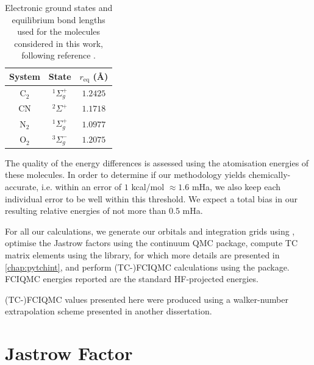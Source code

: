 \begin{table}[htbp]
    \centering
      \caption{
      Electronic ground states and equilibrium bond lengths used for the
      molecules considered in this work, following reference .
    }
    \label{table:bond_lengths}
    \begin{tabular}{ccc}
      System & State & $r_\mathrm{eq}$ (\AA) \\
    \hline \hline
      C$_2$ & ${}^1\Sigma_g^+$ & $1.2425$ \\
      CN    & ${}^2\Sigma^+$   & $1.1718$ \\
      N$_2$ & ${}^1\Sigma_g^+$ & $1.0977$ \\
      O$_2$ & ${}^3\Sigma_g^-$ & $1.2075$ \\
    \hline
    \end{tabular}
\end{table}

The quality of the energy differences is assessed using the atomisation energies of these molecules. In order to determine if our methodology yields chemically-accurate, i.e. within an error of $1$ kcal/mol $\approx 1.6$ mHa, we also keep each individual error to be well within this threshold. We expect a total bias in our resulting relative energies of not more than $0.5$ mHa.

For all our calculations, we generate our orbitals and integration grids using \pyscf,\supercite{sunPySCF2018} optimise the Jastrow factors using the \casino continuum \gls{QMC} package,\supercite{needsVariational2020} compute TC matrix elements using the \tchint library, for which more details are presented in \autoref{chap:pytchint}, and perform (TC-)FCIQMC calculations using the \neci package.\supercite{gutherNECI2020} FCIQMC energies reported are the standard HF-projected energies.

(TC-)FCIQMC values presented here were produced using a walker-number extrapolation scheme presented in another dissertation.\supercite{hosseiniCombining2024}

\section{Jastrow Factor}

